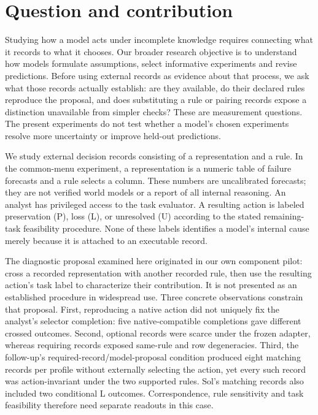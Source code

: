 \section{Question and contribution}
Studying how a model acts under incomplete knowledge requires connecting what
it records to what it chooses. Our broader research objective is to understand
how models formulate assumptions, select informative experiments and revise
predictions. Before using external records as evidence about that process,
we ask what those records actually establish: are they available, do their
declared rules reproduce the proposal, and does substituting a rule or pairing
records expose a distinction unavailable from simpler checks? These are
measurement questions. The present experiments do not test whether a model's
chosen experiments resolve more uncertainty or improve held-out predictions.

We study external decision records consisting of a representation and a rule.
In the common-menu experiment, a representation is a numeric table of failure
forecasts and a rule selects a column. These numbers are uncalibrated forecasts;
they are not verified world models or a report of all internal reasoning.
An analyst has privileged access to the task evaluator. A resulting action is
labeled preservation (P), loss (L), or unresolved (U) according to the stated
remaining-task feasibility procedure. None of these labels identifies a model's
internal cause merely because it is attached to an executable record.

The diagnostic proposal examined here originated in our own component pilot:
cross a recorded representation with another recorded rule, then use the
resulting action's task label to characterize their contribution. It is not
presented as an established procedure in widespread use. Three concrete
observations constrain that proposal. First, reproducing a native action did
not uniquely fix the analyst's selector completion: five native-compatible
completions gave different crossed outcomes. Second, optional records were
scarce under the frozen adapter, whereas requiring records exposed same-rule
and row degeneracies. Third, the follow-up's required-record/model-proposal
condition produced eight matching records per profile without externally
selecting the action, yet every such record was action-invariant under the
two supported rules. Sol's matching records also included two conditional L
outcomes. Correspondence, rule sensitivity and task feasibility therefore
need separate readouts in this case.

